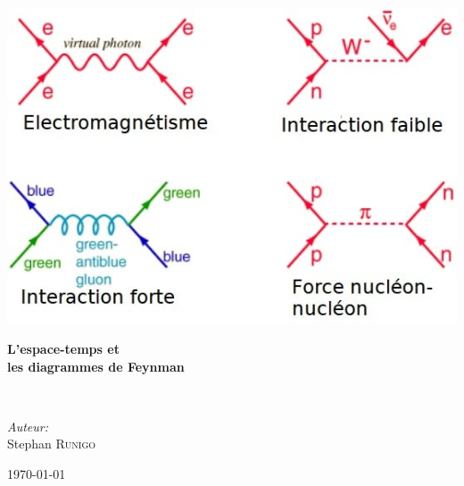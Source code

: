 \begin{titlepage}
%
~\\[1cm]

\textsc{\Large }\\[0.5cm]

\begin{center}
\includegraphics[scale=0.5]{./presentation/diagrammesInteractions}
\end{center}

\vfill


\HRule

\begin{center}
{\huge \bfseries  L'espace-temps et \\
les diagrammes de Feynman\\[0.4cm] }
\end{center}

\HRule \\[1.5cm]

\vfill

\begin{minipage}{0.4\textwidth}
\begin{flushleft} \large
\end{flushleft}
\end{minipage}
\begin{minipage}{0.4\textwidth}
\begin{flushright} \large
\emph{Auteur:}\\
Stephan \textsc{Runigo}
\end{flushright}
\end{minipage}

\vfill

{\large \today}

\end{titlepage}
